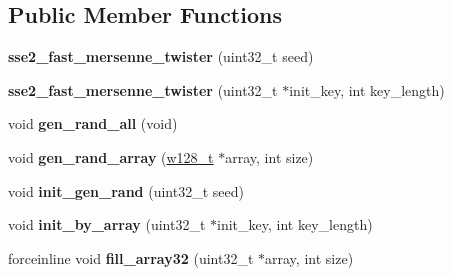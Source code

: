 \subsection*{\-Public \-Member \-Functions}
\begin{DoxyCompactItemize}
\item 
\hypertarget{classsfmtplus_1_1sse2__fast__mersenne__twister_a2f2d24eb68a36bee72135ea82fb4139d}{
{\bfseries sse2\-\_\-fast\-\_\-mersenne\-\_\-twister} (uint32\-\_\-t seed)}
\label{classsfmtplus_1_1sse2__fast__mersenne__twister_a2f2d24eb68a36bee72135ea82fb4139d}

\item 
\hypertarget{classsfmtplus_1_1sse2__fast__mersenne__twister_ab8240a1cbf9cfb240ac27ffc7bb9b568}{
{\bfseries sse2\-\_\-fast\-\_\-mersenne\-\_\-twister} (uint32\-\_\-t $\ast$init\-\_\-key, int key\-\_\-length)}
\label{classsfmtplus_1_1sse2__fast__mersenne__twister_ab8240a1cbf9cfb240ac27ffc7bb9b568}

\item 
\hypertarget{classsfmtplus_1_1sse2__fast__mersenne__twister_a8ee7c3ebdbe2ec0c2a24bd98e9516c02}{
void {\bfseries gen\-\_\-rand\-\_\-all} (void)}
\label{classsfmtplus_1_1sse2__fast__mersenne__twister_a8ee7c3ebdbe2ec0c2a24bd98e9516c02}

\item 
\hypertarget{classsfmtplus_1_1sse2__fast__mersenne__twister_a84b678e8991cc2e342a78d56ae817068}{
void {\bfseries gen\-\_\-rand\-\_\-array} (\hyperlink{unionsfmtplus_1_1sse2__fast__mersenne__twister_1_1w128__t}{w128\-\_\-t} $\ast$array, int size)}
\label{classsfmtplus_1_1sse2__fast__mersenne__twister_a84b678e8991cc2e342a78d56ae817068}

\item 
\hypertarget{classsfmtplus_1_1sse2__fast__mersenne__twister_ae30751d3a8d38c98dc3a51b6366234fd}{
void {\bfseries init\-\_\-gen\-\_\-rand} (uint32\-\_\-t seed)}
\label{classsfmtplus_1_1sse2__fast__mersenne__twister_ae30751d3a8d38c98dc3a51b6366234fd}

\item 
\hypertarget{classsfmtplus_1_1sse2__fast__mersenne__twister_a13dd7f7db6e2999b9de60db10292cba0}{
void {\bfseries init\-\_\-by\-\_\-array} (uint32\-\_\-t $\ast$init\-\_\-key, int key\-\_\-length)}
\label{classsfmtplus_1_1sse2__fast__mersenne__twister_a13dd7f7db6e2999b9de60db10292cba0}

\item 
\hypertarget{classsfmtplus_1_1sse2__fast__mersenne__twister_aa51e133967d463635cf16aa547df8ebf}{
forceinline void {\bfseries fill\-\_\-array32} (uint32\-\_\-t $\ast$array, int size)}
\label{classsfmtplus_1_1sse2__fast__mersenne__twister_aa51e133967d463635cf16aa547df8ebf}


\end{DoxyCompactItemize}
